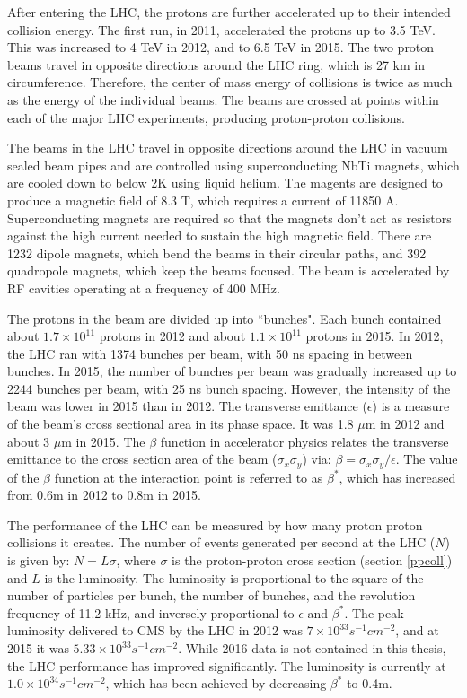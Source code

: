 \documentclass[oneside, letterpaper, oldfontcommands]{memoir}
\begin{document}
\qquad After entering the LHC, the protons are further accelerated up to their intended collision energy. The first run, in 2011, accelerated the protons up to 3.5 TeV. This was increased to 4 TeV in 2012, and to 6.5 TeV in 2015. The two proton beams travel in opposite directions around the LHC ring, which is 27 km in circumference. Therefore, the center of mass energy of collisions is twice as much as the energy of the individual beams. The beams are crossed at points within each of the major LHC experiments, producing proton-proton collisions.

\qquad The beams in the LHC travel in opposite directions around the LHC in vacuum sealed beam pipes and are controlled using superconducting NbTi magnets, which are cooled down to below 2K using liquid helium. The magents are designed to produce a magnetic field of 8.3 T, which requires a current of 11850 A. Superconducting magnets are required so that the magnets don't act as resistors against the high current needed to sustain the high magnetic field. There are 1232 dipole magnets, which bend the beams in their circular paths, and 392 quadropole magnets, which keep the beams focused. The beam is accelerated by RF cavities operating at a frequency of 400 MHz.

\qquad The protons in the beam are divided up into ``bunches". Each bunch contained about $1.7 \times 10^{11}$ protons in 2012 and about $1.1 \times 10^{11}$ protons in 2015. In 2012, the LHC ran with 1374 bunches per beam, with 50 ns spacing in between bunches. In 2015, the number of bunches per beam was gradually increased up to 2244 bunches per beam, with 25 ns bunch spacing. However, the intensity of the beam was lower in 2015 than in 2012. The transverse emittance ($\epsilon$) is a measure of the beam's cross sectional area in its phase space. It was 1.8 $\mu$m in 2012 and about 3 $\mu$m in 2015. The $\beta$ function in accelerator physics relates the transverse emittance to the cross section area of the beam ($\sigma_{x}\sigma_{y}$) via: $ \beta	= \sigma_{x}\sigma_{y} / \epsilon$. The value of the $\beta$ function at the interaction point is referred to as $\beta^{*}$, which has increased from 0.6m in 2012 to 0.8m in 2015.

\qquad The performance of the LHC can be measured by how many proton proton collisions it creates. The number of events generated per second at the LHC ($N$) is given by: $N = L\sigma$, where $\sigma$ is the proton-proton cross section (section \ref{ppcoll}) and $L$ is the luminosity. The luminosity is proportional to the square of the number of particles per bunch, the number of bunches, and the revolution frequency of 11.2 kHz, and inversely proportional to $\epsilon$ and $\beta^{*}$. The peak luminosity delivered to CMS by the LHC in 2012 was $7 \times 10^{33} s^{-1} cm^{-2}$, and at 2015 it was $5.33 \times 10^{33} s^{-1} cm^{-2}$. While 2016 data is not contained in this thesis, the LHC performance has improved significantly. The luminosity is currently at $1.0 \times 10^{34} s^{-1} cm^{-2}$, which has been achieved by decreasing $\beta^{*}$ to 0.4m.
\end{document}

